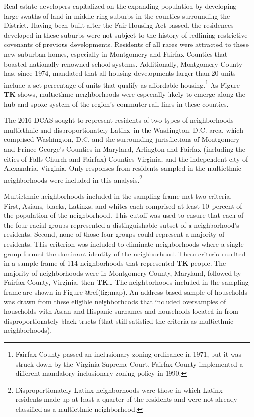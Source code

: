 \documentclass{baderart}
\begin{document}
Real estate developers capitalized on the expanding population by developing large swaths of land in middle-ring suburbs in the counties surrounding the District. Having been built after the Fair Housing Act passed, the residences developed in these suburbs were not subject to the history of redlining restrictive covenants of previous developments. Residents of all races were attracted to these new suburban homes, especially in Montgomery and Fairfax Counties that boasted nationally renowned school systems. Additionally, Montgomery County has, since 1974, mandated that all housing developments larger than 20 units include a set percentage of units that qualify as affordable housing.\footnote{Fairfax County passed an inclusionary   zoning ordinance in 1971, but it was struck down by the Virginia   Supreme Court. Fairfax County implemented a different mandatory   inclusionary zoning policy in 1990.} As Figure \textbf{TK} shows, multiethnic neighborhoods were especially likely to emerge along the hub-and-spoke system of the region's commuter rail lines in these counties.


The 2016 DCAS sought to represent residents of two types of neighborhoods--multiethnic and disproportionately Latinx--in the Washington, D.C. area, which comprised Washington, D.C. and the surrounding jurisdictions of Montgomery and Prince George's Counties in Maryland, Arlington and Fairfax (including the cities of Falls Church and Fairfax) Counties Virginia, and the independent city of Alexandria, Virginia. Only responses from residents sampled in the multiethnic neighborhoods were included in this analysis.\footnote{Disproportionately   Latinx neighborhoods were those in which Latinx residents made up at   least a quarter of the residents and were not already classified as a   multiethnic neighborhood.}

Multiethnic neighborhoods included in the sampling frame met two criteria. First, Asians, blacks, Latinxs, and whites each comprised at least 10~percent of the population of the neighborhood. This cutoff was used to ensure that each of the four racial groups represented a distinguishable subset of a neighborhood's residents. Second, none of those four groups could represent a majority of residents. This criterion was included to eliminate neighborhoods where a single group formed the dominant identity of the neighborhood. These criteria resulted in a sample frame of 114 neighborhoods that represented \textbf{TK} people. The majority of neighborhoods were in Montgomery County, Maryland, followed by Fairfax County, Virginia, then \textbf{TK}\ldots{} The neighborhoods included in the sampling frame are shown in Figure @ref(fig:map). An address-based sample of households was drawn from these eligible neighborhoods that included oversamples of households with Asian and Hispanic surnames and households located in from disproportionately black tracts (that still satisfied the criteria as multiethnic neighborhoods).
\end{document}
